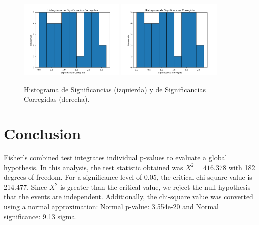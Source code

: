 \documentclass[12pt]{article}
\begin{document}
\begin{figure}[h!]
\centering
\includegraphics[width=0.45\textwidth]{2nd_TransitPSF_0.3corrected_significance_hist.png}
\hfill
\includegraphics[width=0.45\textwidth]{2nd_TransitPSF_0.3corrected_significance_hist.png}
\caption{Histograma de Significancias (izquierda) y de Significancias Corregidas (derecha).}
\end{figure}


\section*{Conclusion}
Fisher's combined test integrates individual p-values to evaluate a global hypothesis. 
In this analysis, the test statistic obtained was $X^2 = 416.378$ with 182 degrees of freedom. 
For a significance level of 0.05, the critical chi-square value is 214.477. 
Since $X^2$ is greater than the critical value, 
we reject the null hypothesis that the events are independent.
\newline
Additionally, the chi-square value was converted using a normal approximation:
\newline
Normal p-value: 3.554e-20 and Normal significance: 9.13 sigma.
\end{document}
